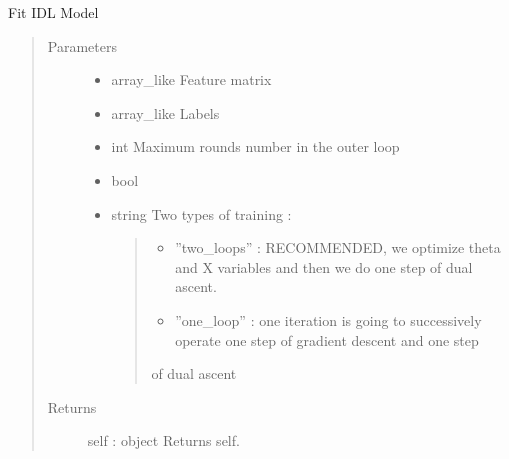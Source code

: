 \documentclass[letterpaper,10pt,english]{sphinxmanual}
\begin{document}
\begin{fulllineitems}
\begin{description}
\end{description}

\begin{fulllineitems}
\label{\detokenize{sections/learning:IDL.IDLModel.fit}}
Fit IDL Model
\begin{quote}\begin{description}
\item[{Parameters}] \leavevmode\begin{itemize}
\item {} 
 \textendash{} array\_like
Feature matrix

\item {} 
 \textendash{} array\_like
Labels

\item {} 
 \textendash{} int
Maximum rounds number in the outer loop

\item {} 
 \textendash{} bool

\item {} 
 \textendash{} 
string
Two types of training :
\begin{quote}
\begin{itemize}
\item {} 
”two\_loops” : RECOMMENDED, we optimize theta and X variables and then we do one step of dual ascent.

\item {} 
”one\_loop” : one iteration is going to successively operate one step of gradient descent and one step

\end{itemize}

of dual ascent
\end{quote}


\end{itemize}

\item[{Returns}] \leavevmode
self : object
Returns self.

\end{description}\end{quote}

\end{fulllineitems}


\end{fulllineitems}
\end{document}
